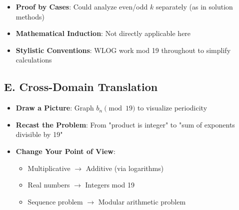\documentclass[11pt]{article}
\begin{document}
\begin{strategicbox}
\begin{itemize}[leftmargin=*]
    \item \textbf{Proof by Cases}: Could analyze even/odd $k$ separately (as in solution methods)
    
    \item \textbf{Mathematical Induction}: Not directly applicable here
    
    \item \textbf{Stylistic Conventions}: WLOG work mod 19 throughout to simplify calculations
\end{itemize}

\subsection*{E. Cross-Domain Translation}
\begin{itemize}[leftmargin=*]
    \item \textbf{Draw a Picture}: Graph $b_n \pmod{19}$ to visualize periodicity
    
    \item \textbf{Recast the Problem}: From "product is integer" to "sum of exponents divisible by 19"
    
    \item \textbf{Change Your Point of View}: 
    \begin{itemize}
        \item Multiplicative $\rightarrow$ Additive (via logarithms)
        \item Real numbers $\rightarrow$ Integers mod 19
        \item Sequence problem $\rightarrow$ Modular arithmetic problem
    \end{itemize}
\end{itemize}
\end{strategicbox}
\end{document}
